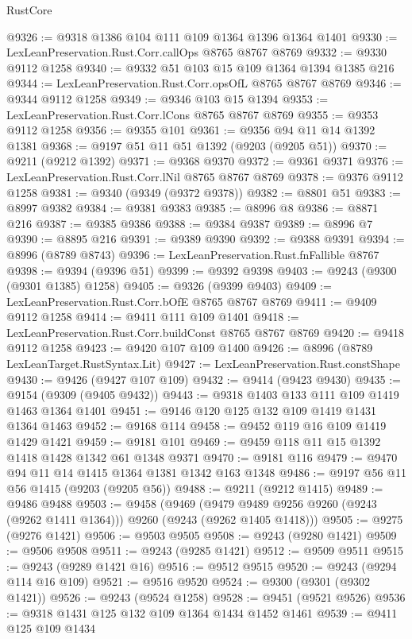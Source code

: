 \begin{lexlean}{RustCore}
\begin{coremodule}
@9326 := @9318 @1386 @104 @111 @109 @1364 @1396 @1364 @1401
@9330 := LexLeanPreservation.Rust.Corr.callOps @8765 @8767 @8769
@9332 := @9330 @9112 @1258
@9340 := @9332 @51 @103 @15 @109 @1364 @1394 @1385 @216
@9344 := LexLeanPreservation.Rust.Corr.opsOfL @8765 @8767 @8769
@9346 := @9344 @9112 @1258
@9349 := @9346 @103 @15 @1394
@9353 := LexLeanPreservation.Rust.Corr.lCons @8765 @8767 @8769
@9355 := @9353 @9112 @1258
@9356 := @9355 @101
@9361 := @9356 @94 @11 @14 @1392 @1381
@9368 := @9197 @51 @11 @51 @1392 (@9203 (@9205 @51))
@9370 := @9211 (@9212 @1392)
@9371 := @9368 @9370
@9372 := @9361 @9371
@9376 := LexLeanPreservation.Rust.Corr.lNil @8765 @8767 @8769
@9378 := @9376 @9112 @1258
@9381 := @9340 (@9349 (@9372 @9378))
@9382 := @8801 @51
@9383 := @8997 @9382
@9384 := @9381 @9383
@9385 := @8996 @8
@9386 := @8871 @216
@9387 := @9385 @9386
@9388 := @9384 @9387
@9389 := @8996 @7
@9390 := @8895 @216
@9391 := @9389 @9390
@9392 := @9388 @9391
@9394 := @8996 (@8789 @8743)
@9396 := LexLeanPreservation.Rust.fnFallible @8767
@9398 := @9394 (@9396 @51)
@9399 := @9392 @9398
@9403 := @9243 (@9300 (@9301 @1385) @1258)
@9405 := @9326 (@9399 @9403)
@9409 := LexLeanPreservation.Rust.Corr.bOfE @8765 @8767 @8769
@9411 := @9409 @9112 @1258
@9414 := @9411 @111 @109 @1401
@9418 := LexLeanPreservation.Rust.Corr.buildConst @8765 @8767 @8769
@9420 := @9418 @9112 @1258
@9423 := @9420 @107 @109 @1400
@9426 := @8996 (@8789 LexLeanTarget.RustSyntax.Lit)
@9427 := LexLeanPreservation.Rust.constShape
@9430 := @9426 (@9427 @107 @109)
@9432 := @9414 (@9423 @9430)
@9435 := @9154 (@9309 (@9405 @9432))
@9443 := @9318 @1403 @133 @111 @109 @1419 @1463 @1364 @1401
@9451 := @9146 @120 @125 @132 @109 @1419 @1431 @1364 @1463
@9452 := @9168 @114
@9458 := @9452 @119 @16 @109 @1419 @1429 @1421
@9459 := @9181 @101
@9469 := @9459 @118 @11 @15 @1392 @1418 @1428 @1342 @61 @1348 @9371
@9470 := @9181 @116
@9479 := @9470 @94 @11 @14 @1415 @1364 @1381 @1342 @163 @1348
@9486 := @9197 @56 @11 @56 @1415 (@9203 (@9205 @56))
@9488 := @9211 (@9212 @1415)
@9489 := @9486 @9488
@9503 := @9458
    (@9469 (@9479 @9489 @9256 @9260 (@9243 (@9262 @1411 @1364))) @9260 (@9243 (@9262 @1405 @1418)))
@9505 := @9275 (@9276 @1421)
@9506 := @9503 @9505
@9508 := @9243 (@9280 @1421)
@9509 := @9506 @9508
@9511 := @9243 (@9285 @1421)
@9512 := @9509 @9511
@9515 := @9243 (@9289 @1421 @16)
@9516 := @9512 @9515
@9520 := @9243 (@9294 @114 @16 @109)
@9521 := @9516 @9520
@9524 := @9300 (@9301 (@9302 @1421))
@9526 := @9243 (@9524 @1258)
@9528 := @9451 (@9521 @9526)
@9536 := @9318 @1431 @125 @132 @109 @1364 @1434 @1452 @1461
@9539 := @9411 @125 @109 @1434

\end{coremodule}
\end{lexlean}
